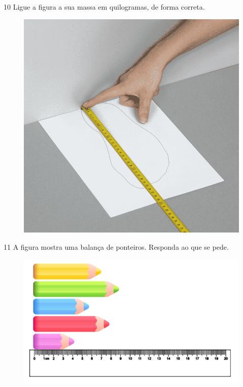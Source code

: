 
\num{10} Ligue a figura a sua massa em quilogramas, de forma correta.

\begin{figure}[htpb!]
\centering
\includegraphics[width=.85\textwidth]{./media/image41.png}
\end{figure}

\pagebreak
\num{11} A figura mostra uma balança de ponteiros. Responda ao que se pede.

\begin{figure}[htpb!]
\centering
\includegraphics[width=.7\textwidth]{./media/image42.png}
\end{figure}

